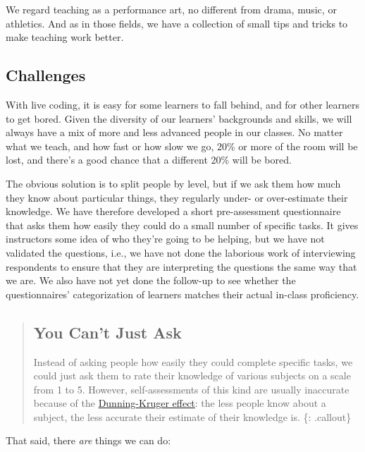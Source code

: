 
We regard teaching as a performance art, no different from drama, music,
or athletics. And as in those fields, we have a collection of small tips
and tricks to make teaching work better.

\subsection{Challenges}\label{challenges}

With live coding, it is easy for some learners to fall behind, and for
other learners to get bored. Given the diversity of our learners'
backgrounds and skills, we will always have a mix of more and less
advanced people in our classes. No matter what we teach, and how fast or
how slow we go, 20\% or more of the room will be lost, and there's a
good chance that a different 20\% will be bored.

The obvious solution is to split people by level, but if we ask them how
much they know about particular things, they regularly under- or
over-estimate their knowledge. We have therefore developed a short
pre-assessment questionnaire that asks them how easily they could do a
small number of specific tasks. It gives instructors some idea of who
they're going to be helping, but we have not validated the questions,
i.e., we have not done the laborious work of interviewing respondents to
ensure that they are interpreting the questions the same way that we
are. We also have not yet done the follow-up to see whether the
questionnaires' categorization of learners matches their actual in-class
proficiency.

\begin{quote}
\subsection{You Can't Just Ask}\label{you-cant-just-ask}

Instead of asking people how easily they could complete specific tasks,
we could just ask them to rate their knowledge of various subjects on a
scale from 1 to 5. However, self-assessments of this kind are usually
inaccurate because of the
\href{https://en.wikipedia.org/wiki/Dunning\%E2\%80\%93Kruger_effect}{Dunning-Kruger
effect}: the less people know about a subject, the less accurate their
estimate of their knowledge is. \{: .callout\}
\end{quote}

That said, there \emph{are} things we can do:

